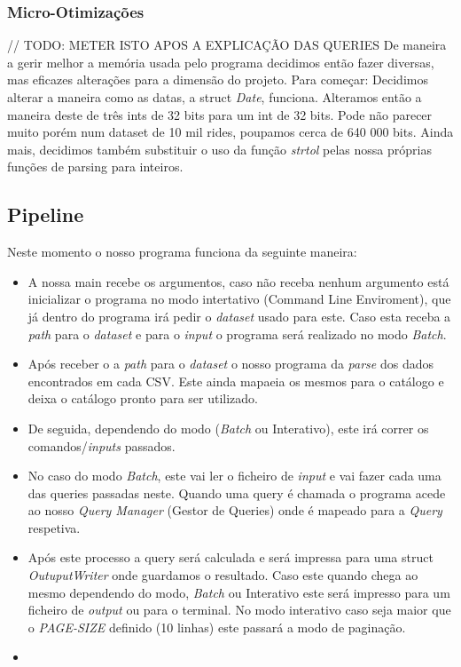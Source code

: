 \documentclass{article}
\begin{document}
        \subsubsection{Micro-Otimizações}
        // TODO: METER ISTO APOS A EXPLICAÇÃO DAS QUERIES
            De maneira a gerir melhor a memória usada pelo programa decidimos então
            fazer diversas, mas eficazes alterações para a dimensão do projeto.
            Para começar:
            Decidimos alterar a maneira como as datas, a struct \emph{Date},
            funciona. Alteramos então a maneira deste de três ints de 32 bits para um int de 32 bits.
            Pode não parecer muito porém num dataset de 10 mil rides, poupamos cerca de 
            640 000 bits.
            Ainda mais, decidimos também substituir o uso da função \emph{strtol}
            pelas nossa próprias funções de parsing para inteiros.

    \subsection{Pipeline}
        Neste momento o nosso programa funciona da seguinte maneira:
        \begin{itemize}
            \item A nossa main recebe os argumentos, caso não receba nenhum argumento 
            está inicializar o programa no modo intertativo (Command Line Enviroment), 
            que já dentro do programa irá pedir o \emph{dataset} usado para este. Caso 
            esta receba a \emph{path} para o \emph{dataset} e para o \emph{input} o programa 
            será realizado no modo \emph{Batch}.
            \item Após receber o a \emph{path} para o \emph{dataset} o nosso programa da
            \emph{parse} dos dados encontrados em cada CSV. Este ainda mapaeia os mesmos 
            para o catálogo e deixa o catálogo pronto para ser utilizado.
            \item De seguida, dependendo do modo (\emph{Batch} ou Interativo), este irá 
            correr os comandos/\emph{inputs} passados.
            \item No caso do modo \emph{Batch}, este vai ler o ficheiro de \emph{input} 
            e vai fazer cada uma das queries passadas neste. Quando uma query é chamada 
            o programa acede ao nosso \emph{Query Manager} (Gestor de Queries) onde é 
            mapeado para a \emph{Query} respetiva. 
            \item Após este processo a query será calculada e será impressa para uma struct
            \emph{OutuputWriter} onde guardamos o resultado. Caso este quando chega ao mesmo 
            dependendo do modo, \emph{Batch} ou Interativo este será impresso para um ficheiro
            de \emph{output} ou para o terminal. No modo interativo caso seja maior que o 
            \emph{PAGE-SIZE} definido (10 linhas) este passará a modo de paginação.
            \item 
            
        \end{itemize}
\end{document}
